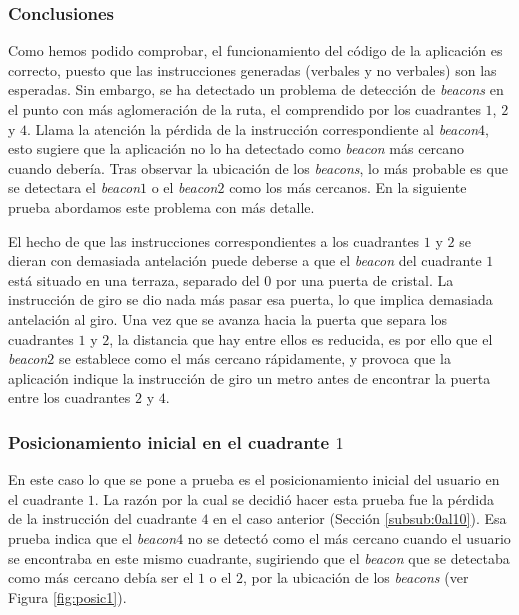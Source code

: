 \subsubsection*{Conclusiones}

Como hemos podido comprobar, el funcionamiento del código de la aplicación es correcto, puesto que las instrucciones generadas (verbales y no verbales) son las esperadas. Sin embargo, se ha detectado un problema de detección de \textit{beacons} en el punto con más aglomeración de la ruta, el comprendido por los cuadrantes $1$, $2$ y $4$. Llama la atención la pérdida de la instrucción correspondiente al \textit{beacon$4$}, esto sugiere que la aplicación no lo ha detectado como \textit{beacon} más cercano cuando debería. Tras observar la ubicación de los \textit{beacons}, lo más probable es que se detectara el \textit{beacon$1$} o el \textit{beacon$2$} como los más cercanos. En la siguiente prueba abordamos este problema con más detalle. 

El hecho de que las instrucciones correspondientes a los cuadrantes $1$ y $2$ se dieran con demasiada antelación puede deberse a que el \textit{beacon} del cuadrante $1$ está situado en una terraza, separado del $0$ por una puerta de cristal. La instrucción de giro se dio nada más pasar esa puerta, lo que implica demasiada antelación al giro. Una vez que se avanza hacia la puerta que separa los cuadrantes $1$ y $2$, la distancia que hay entre ellos es reducida, es por ello que el \textit{beacon$2$} se establece como el más cercano rápidamente, y provoca que la aplicación indique la instrucción de giro un metro antes de encontrar la puerta entre los cuadrantes $2$ y $4$.


\subsubsection{Posicionamiento inicial en el cuadrante $1$}
\label{subsub:pos1}

En este caso lo que se pone a prueba es el posicionamiento inicial del usuario en el cuadrante $1$. La razón por la cual se decidió hacer esta prueba fue la pérdida de la instrucción del cuadrante $4$ en el caso anterior (Sección \ref{subsub:0al10}). Esa prueba indica que el \textit{beacon$4$} no se detectó como el más cercano cuando el usuario se encontraba en este mismo cuadrante, sugiriendo que el \textit{beacon} que se detectaba como más cercano debía ser el $1$ o el $2$, por la ubicación de los \textit{beacons} (ver Figura \ref{fig:posic1}).


